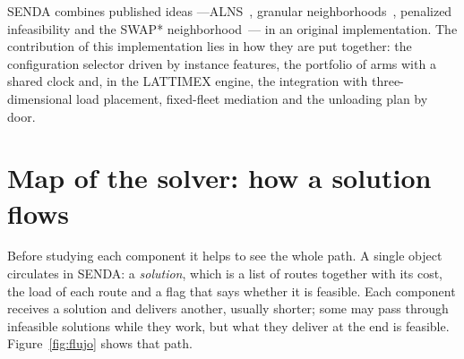 \documentclass[11pt,a4paper]{article}
\newcommand{\senda}{SENDA}
\begin{document}
SENDA combines published ideas ---ALNS~\cite{ropke2006}, granular
neighborhoods~\cite{toth2003granular}, penalized infeasibility and the SWAP*
neighborhood~\cite{vidal2022hgs}--- in an original implementation. The contribution of this
implementation lies in how they are put together: the configuration selector driven by instance
features, the portfolio of arms with a shared clock and, in the LATTIMEX engine, the integration with
three-dimensional load placement, fixed-fleet mediation and the unloading plan by door.

\section{Map of the solver: how a solution flows}
\label{sec:flujo}

Before studying each component it helps to see the whole path. A single object circulates in
\senda{}: a \emph{solution}, which is a list of routes together with its cost, the load of each route
and a flag that says whether it is feasible. Each component receives a solution and delivers
another, usually shorter; some may pass through infeasible solutions while they work, but what they
deliver at the end is feasible. Figure~\ref{fig:flujo} shows that path.
\end{document}
